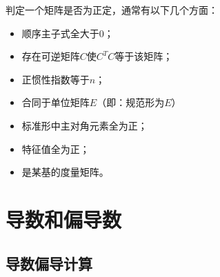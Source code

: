 判定一个矩阵是否为正定，通常有以下几个方面：  

\begin{itemize}\itemsep0em
		\item 顺序主子式全大于0；  
		\item 存在可逆矩阵$C$使$C^TC$等于该矩阵；
		\item 正惯性指数等于$n$；
		\item 合同于单位矩阵$E$（即：规范形为$E$）
		\item 标准形中主对角元素全为正；
		\item 特征值全为正；
		\item 是某基的度量矩阵。
\end{itemize}


\section{导数和偏导数}

\subsection{导数偏导计算}

